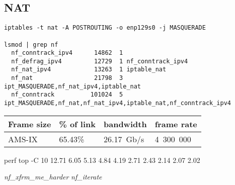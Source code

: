 
\subsection{NAT}

\begin{lstlisting}
iptables -t nat -A POSTROUTING -o enp129s0 -j MASQUERADE

lsmod | grep nf
  nf_conntrack_ipv4      14862  1 
  nf_defrag_ipv4         12729  1 nf_conntrack_ipv4
  nf_nat_ipv4            13263  1 iptable_nat
  nf_nat                 21798  3 ipt_MASQUERADE,nf_nat_ipv4,iptable_nat
  nf_conntrack          101024  5 ipt_MASQUERADE,nf_nat,nf_nat_ipv4,iptable_nat,nf_conntrack_ipv4
\end{lstlisting}

\begin{tabular}{ | l | l | l | l | }
\hline
Frame size & \% of link & bandwidth & frame rate \\
\hline
AMS-IX & 65.43\% & 26.17~Gb/s & 4~300~000 \\
\hline
\end{tabular}

perf top -C 10
  12.71%
   6.05%
   5.13%
   4.84%
   4.19%
   2.71%
   2.43%
   2.14%
   2.07%
   2.02%

{\it{nf\_xfrm\_me\_harder}}
{\it{nf\_iterate}}
